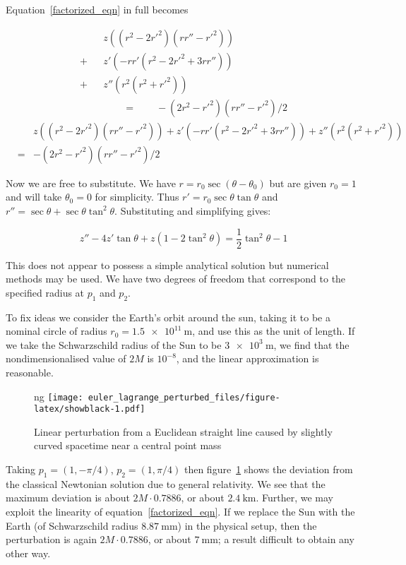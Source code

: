 \documentclass[pdflatex,sn-mathphys-num]{sn-jnl}%
\theoremstyle{thmstyleone}%
\theoremstyle{thmstyletwo}%
\theoremstyle{thmstylethree}%
\begin{document}
Equation~\ref{factorized_eqn} in full becomes

\begin{eqnarray}
 &{}&z   \left((r^2 - 2r'^2)(rr''-r'^2)\right)\nonumber\\
+&{}&z'  \left(-rr'(r^2 - 2r'^2 + 3rr'')\right)\nonumber\\
+&{}&z'' \left(r^2    (r^2+r'^2)       \right)\nonumber\\
&{}&\qquad =\qquad -(2r^2-r'^2)(rr''-r'^2)/2
\end{eqnarray}
\begin{eqnarray}
  &{}&
  z   \left((r^2 - 2r'^2)(rr''-r'^2)\right)
  +z'  \left(-rr'(r^2 - 2r'^2 + 3rr'')\right)
  +z'' \left(r^2    (r^2+r'^2)       \right)\nonumber\\
 &=& -(2r^2-r'^2)(rr''-r'^2)/2
\end{eqnarray}

Now we are free to substitute.  We have $r=r_0\sec(\theta-\theta_0)$
but are given $r_0=1$ and will take $\theta_0=0$ for simplicity.  Thus
$r'= r_0\sec\theta\tan\theta$ and
$r''=\sec\theta+\sec\theta\tan^2\theta$.  Substituting and simplifying
gives:

\begin{equation}\label{string_ODE}
z'' - 4z'\tan \theta + z(1-2\tan^2\theta) = {\scriptstyle\frac{1}{2}}\tan^2\theta - 1
\end{equation}

This does not appear to possess a simple analytical solution but
numerical methods may be used.  We have two degrees of freedom that
correspond to the specified radius at $p_1$ and $p_2$.

To fix ideas we consider the Earth's orbit around the sun, taking it
to be a nominal circle of radius $r_0 = \qty{1.5e11}{\m}$,
and use this as the unit of length.  If we take the Schwarzschild
radius of the Sun to be $\qty{3e3}{\m}$, we find that the
nondimensionalised value of $2M$ is $10^{-8}$, and the linear
approximation is reasonable.

\begin{figure}[h]
\centering ng %
\texttt{[image: euler\_lagrange\_perturbed\_files/figure-latex/showblack-1.pdf]}
\caption{Linear perturbation from a Euclidean straight line caused by slightly curved spacetime 
  near a central point mass}
\label{showblack}
\end{figure}
 
Taking $p_1=(1,-\pi/4)$, $p_2=(1,\pi/4)$ then figure~\ref{showblack}
shows the deviation from the classical Newtonian solution due to
general relativity.  We see that the maximum deviation is about
$2M\cdot 0.7886$, or about $\qty{2.4}{\km}$.  Further, we may exploit
the linearity of equation~\ref{factorized_eqn}.  If we replace the Sun
with the Earth (of Schwarzschild radius $\qty{8.87}{\mm}$) in the
physical setup, then the perturbation is again $2M\cdot 0.7886$, or
about $\qty{7}{\mm}$; a result difficult to obtain any other way.
\end{document}
